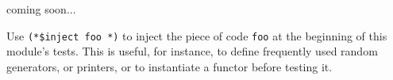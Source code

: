  coming soon...

Use \verb!(*$inject foo *)! to inject the piece of code \verb!foo! at the beginning
of this module's tests. This is useful, for instance, to define
frequently used random generators, or printers, or
to instantiate a functor before testing it.

